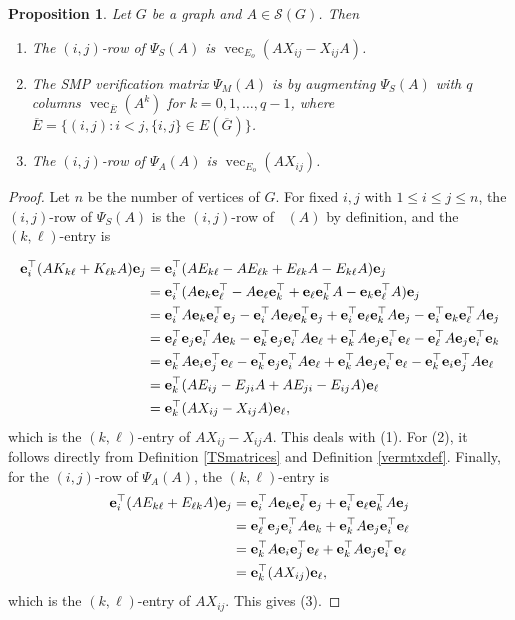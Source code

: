 \documentclass[11pt]{article}
\newtheorem{prop}[thm]{Proposition}
\theoremstyle{definition}
\theoremstyle{definition}
\theoremstyle{definition}
\DeclareMathOperator{\TSS}{TS_S}
\newcommand{\Ec}{\overline{E}}
\newcommand{\verA}{\Psi_A}
\newcommand{\verM}{\Psi_M}
\newcommand{\verS}{\Psi_S}
\newcommand{\be}{{\bf e}}
\newcommand{\mptn}{\mathcal{S}} %
\newcommand{\vect}{\operatorname{vec}}
\def\trans{^{\top}}
\begin{document}
\begin{prop}\label{normalspace}
Let $G$ be a graph and $A\in\mptn(G)$.  Then 
\begin{enumerate}
\item The $(i,j)$-row of $\verS(A)$ is $\vect_{E_o}(AX_{ij}-X_{ij}A)$.
\item The SMP verification matrix $\verM(A)$ is by augmenting $\verS(A)$ with $q$ columns $\vect_{\Ec}(A^k)$ for $k=0,1,\ldots, q-1$, where $\overline{E}=\{(i,j):i<j,\{i,j\}\in E(\overline{G})\}$.
\item The $(i,j)$-row of $\verA(A)$ is $\vect_{E_o}(AX_{ij})$.
\end{enumerate}
\end{prop}
\begin{proof}
Let $n$ be the number of vertices of $G$.  For fixed $i,j$ with $1\leq i\leq j\leq n$, the $(i,j)$-row of $\verS(A)$ is the $(i,j)$-row of $\TSS(A)$ by definition, and the $(k,\ell)$-entry is 

\[\begin{aligned}
\be_i\trans(AK_{k\ell}+K_{\ell k}A)\be_j &=\be_i\trans(AE_{k\ell}-AE_{\ell k}+E_{\ell k}A-E_{k\ell}A)\be_j \\
 &= \be_i\trans(A\be_k\be_\ell\trans-A\be_\ell\be_k\trans+\be_\ell\be_k\trans A-\be_k\be_\ell\trans A)\be_j \\
 &= \be_i\trans A\be_k\be_\ell\trans\be_j-\be_i\trans A\be_\ell\be_k\trans\be_j+\be_i\trans \be_\ell\be_k\trans A\be_j-\be_i\trans \be_k\be_\ell\trans A\be_j \\
 &= \be_\ell\trans\be_j\be_i\trans A\be_k-\be_k\trans\be_j\be_i\trans A\be_\ell+\be_k\trans A\be_j\be_i\trans \be_\ell-\be_\ell\trans A\be_j\be_i\trans \be_k \\
 &= \be_k\trans A\be_i\be_j\trans\be_\ell-\be_k\trans\be_j\be_i\trans A\be_\ell+\be_k\trans A\be_j\be_i\trans \be_\ell-\be_k\trans\be_i\be_j\trans A\be_\ell \\
 &=\be_k\trans(AE_{ij}-E_{ji}A+AE_{ji}-E_{ij}A)\be_\ell \\
 &=\be_k\trans(AX_{ij}-X_{ij}A)\be_\ell, \\
\end{aligned}\]
which is the $(k,\ell)$-entry of $AX_{ij}-X_{ij}A$.  This deals with (1).  For (2), it follows directly from Definition \ref{TSmatrices} and Definition \ref{vermtxdef}.  Finally, for the $(i,j)$-row of $\verA(A)$, the $(k,\ell)$-entry is 
\[\begin{aligned}
\be_i\trans(AE_{k\ell}+E_{\ell k}A)\be_j 
 &= \be_i\trans A\be_k\be_\ell\trans\be_j+\be_i\trans\be_\ell\be_k\trans A\be_j \\
 &= \be_\ell\trans\be_j\be_i\trans A\be_k+\be_k\trans A\be_j\be_i\trans\be_\ell \\
 &= \be_k\trans A\be_i\be_j\trans\be_\ell+\be_k\trans A\be_j\be_i\trans\be_\ell \\
 &= \be_k\trans (AX_{ij})\be_\ell,
\end{aligned}\]
which is the $(k,\ell)$-entry of $AX_{ij}$.  This gives (3).
\end{proof}
\end{document}
